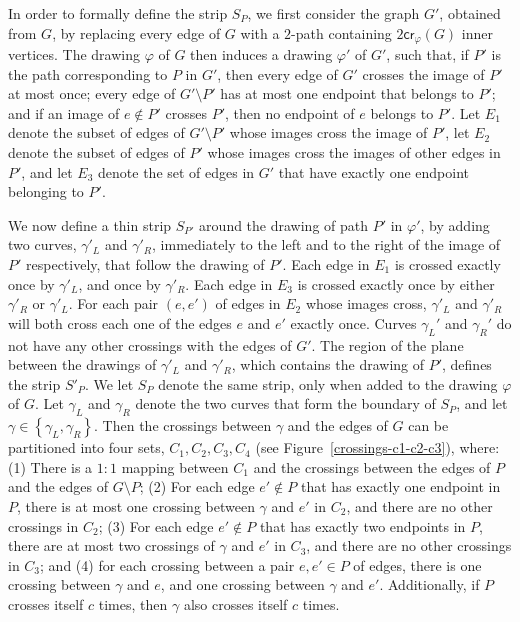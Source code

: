 \documentclass[twoside,leqno,twocolumn]{article}
\newcommand{\set}[1]{\left\{ #1 \right\}}
\renewcommand{\phi}{\varphi}
\newcommand{\cro}{\mathsf{cr}}
\begin{document}
In order to formally define the strip $S_P$, we first consider the graph $G'$, obtained from $G$, by replacing every edge of $G$ with a $2$-path containing $2\cro_{\phi}(G)$ inner vertices. The drawing $\phi$ of $G$ then induces a drawing $\phi'$ of $G'$, such that, if $P'$ is the path corresponding to $P$  in $G'$, then every edge of $G'$ crosses the image of $P'$ at most once; every edge of $G'\setminus P'$ has at most one endpoint that belongs to $P'$; and if an image of $e\not\in P'$ crosses $P'$, then no endpoint of $e$ belongs to $P'$. Let $E_1$ denote the subset of edges of $G'\setminus P'$ whose images cross the image of $P'$, let $E_2$ denote the subset of edges of $P'$ whose images cross the images of other edges in $P'$, and let $E_3$ denote the set of edges in $G'$ that have exactly one endpoint belonging to $P'$.

We now define a thin strip $S_{P'}$ around the drawing of path $P'$ in $\phi'$, by adding two curves, $\gamma'_L$ and $\gamma'_R$, immediately to the left and to the right of the image of $P'$ respectively, that follow the drawing of $P'$. Each edge in $E_1$ is crossed exactly once by $\gamma'_L$, and once by $\gamma'_R$. Each edge in $E_3$ is crossed exactly once by either $\gamma'_R$ or $\gamma'_L$. For each pair $(e,e')$ of edges in $E_2$ whose images cross, $\gamma'_L$ and $\gamma'_R$ will both cross each one of the edges $e$ and $e'$ exactly once. Curves $\gamma_L'$ and $\gamma_R'$ do not have any other crossings with the edges of $G'$. The region of the plane between the drawings of $\gamma'_L$ and $\gamma'_R$, which contains the drawing of $P'$, defines the strip $S'_P$. We let $S_P$ denote the same strip, only when added to the drawing $\phi$ of $G$. Let $\gamma_L$ and $\gamma_R$ denote the two curves that form the boundary of $S_P$, and let $\gamma\in \set{\gamma_L,\gamma_R}$. Then the crossings between $\gamma$ and the edges of $G$ can be partitioned into four sets, $C_1,C_2,C_3, C_4$ (see Figure~\ref{crossings-c1-c2-c3}), where: (1) There is a $1:1$ mapping between $C_1$ and the crossings between the edges of $P$ and the edges of $G\setminus P$; (2) For each edge $e'\not\in P$ that has exactly one endpoint in $P$, there is at most one crossing between $\gamma$ and $e'$ in $C_2$, and there are no other crossings in $C_2$; (3) For each edge $e'\not\in P$ that has exactly two endpoints in $P$, there are at most two crossings of $\gamma$ and $e'$ in $C_3$, and there are no other crossings in $C_3$; and (4) for each crossing between a pair $e,e'\in P$ of edges, there is one crossing between $\gamma$ and $e$, and one crossing between $\gamma$ and $e'$. Additionally, if $P$ crosses itself $c$ times, then $\gamma$ also crosses itself $c$ times.
\end{document}
